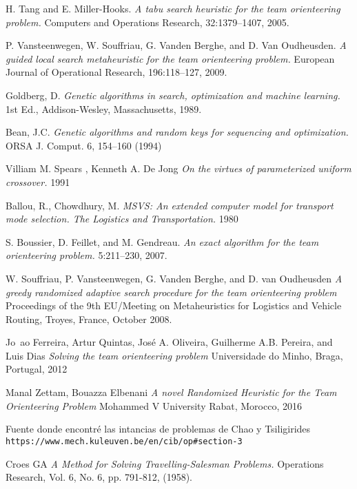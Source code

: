 \begin{thebibliography}{9}
H. Tang and E. Miller-Hooks.
\textit{A tabu search heuristic for the team orienteering problem.}
Computers and Operations Research, 32:1379–1407, 2005.

P. Vansteenwegen, W. Souffriau, G. Vanden Berghe, and D. Van Oudheusden.
\textit{A guided local search metaheuristic for the team orienteering problem.}
European Journal of Operational Research, 196:118–127, 2009.

Goldberg, D.
\textit{Genetic algorithms in search, optimization and machine learning.}
1st Ed., Addison-Wesley, Massachusetts, 1989.

Bean, J.C.
\textit{Genetic algorithms and random keys for sequencing and optimization.}
ORSA J. Comput. 6, 154–160 (1994)

Villiam M. Spears , Kenneth A. De Jong
\textit{On the virtues of parameterized uniform crossover.}
1991

Ballou, R., Chowdhury, M.
\textit{MSVS: An extended computer model for transport mode selection. The Logistics and Transportation.}
1980

S. Boussier, D. Feillet, and M. Gendreau.
\textit{An exact algorithm for the team orienteering problem.}
5:211–230, 2007.

W. Souffriau, P. Vansteenwegen, G. Vanden Berghe, and D. van Oudheusden
\textit{A greedy randomized adaptive search procedure for the team orienteering problem}
Proceedings of the 9th EU/Meeting on Metaheuristics for Logistics and Vehicle Routing, Troyes, France, October 2008.

Jo~ao Ferreira, Artur Quintas, José A. Oliveira, Guilherme A.B. Pereira, and Luis Dias
\textit{Solving the team orienteering problem}
Universidade do Minho, Braga, Portugal, 2012

Manal Zettam, Bouazza Elbenani
\textit{A novel Randomized Heuristic for the Team Orienteering Problem}
Mohammed V University Rabat, Morocco, 2016

Fuente donde encontré las intancias de problemas de Chao y Tsiligirides
\\\texttt{https://www.mech.kuleuven.be/en/cib/op\#section-3}

Croes GA
\textit{A Method for Solving Travelling-Salesman Problems.}
Operations Research, Vol. 6, No. 6, pp. 791-812, (1958).

\end{thebibliography}
